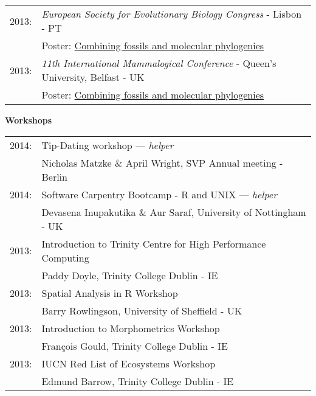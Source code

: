 \documentclass[10pt,a4paper]{article}
\begin{document}
{\begin{tabular}{ll}
2013: & \textit{European Society for Evolutionary Biology Congress} - Lisbon - PT \\
& Poster: \href{http://figshare.com/articles/Combining_fossils_and_molecular_phylogenies/1056300}{Combining fossils and molecular phylogenies}\\
2013: & \textit{11th International Mammalogical Conference} - Queen’s University, Belfast - UK \\
& Poster: \href{http://figshare.com/articles/Combining_fossils_and_molecular_phylogenies/1056300}{Combining fossils and molecular phylogenies}\\
\end{tabular}
\bigskip

\raggedright\textbf{Workshops}\\[1.5ex]
\begin{tabular}{ll}
2014: & Tip-Dating workshop --- \textit{helper}\\
& Nicholas Matzke \& April Wright, SVP Annual meeting - Berlin\\
2014: & Software Carpentry Bootcamp - R and UNIX --- \textit{helper}\\
& Devasena Inupakutika \& Aur Saraf, University of Nottingham - UK\\
2013: & Introduction to Trinity Centre for High Performance Computing\\
& Paddy Doyle, Trinity College Dublin - IE\\
2013: & Spatial Analysis in R Workshop\\
& Barry Rowlingson, University of Sheffield - UK\\
2013: & Introduction to Morphometrics Workshop\\
& Fran\c{c}ois Gould, Trinity College Dublin - IE\\
2013: & IUCN Red List of Ecosystems Workshop\\
& Edmund Barrow, Trinity College Dublin - IE\\

\end{tabular}
\bigskip

}
\end{document}
